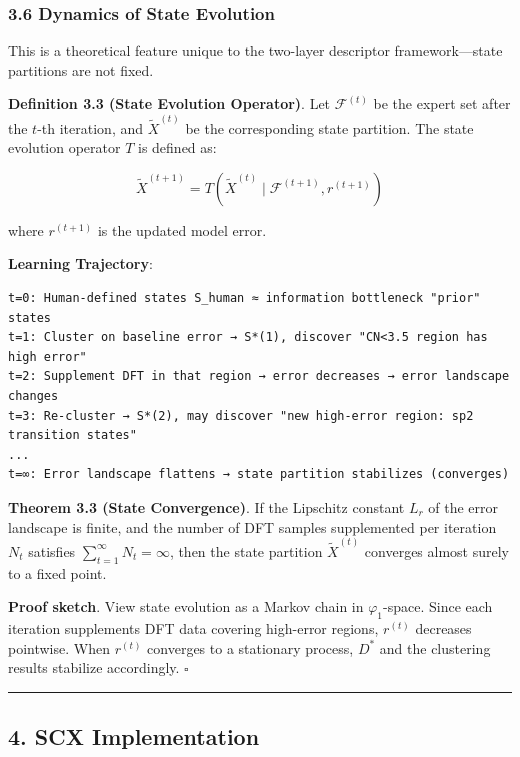\documentclass[
  12pt,
]{article}
\begin{document}
\subsubsection{3.6 Dynamics of State Evolution}\label{dynamics-of-state-evolution}

This is a theoretical feature unique to the two-layer descriptor framework---state partitions are not fixed.

\textbf{Definition 3.3 (State Evolution Operator)}. Let $\mathcal{F}^{(t)}$ be the expert set after the $t$-th iteration, and $\tilde{X}^{(t)}$ be the corresponding state partition. The state evolution operator $T$ is defined as:

\[\tilde{X}^{(t+1)} = T(\tilde{X}^{(t)} \mid \mathcal{F}^{(t+1)}, r^{(t+1)})\]

where $r^{(t+1)}$ is the updated model error.

\textbf{Learning Trajectory}:

\begin{verbatim}
t=0: Human-defined states S_human ≈ information bottleneck "prior" states
t=1: Cluster on baseline error → S*(1), discover "CN<3.5 region has high error"
t=2: Supplement DFT in that region → error decreases → error landscape changes
t=3: Re-cluster → S*(2), may discover "new high-error region: sp2 transition states"
...
t=∞: Error landscape flattens → state partition stabilizes (converges)
\end{verbatim}

\textbf{Theorem 3.3 (State Convergence)}. If the Lipschitz constant $L_r$ of the error landscape is finite, and the number of DFT samples supplemented per iteration $N_t$ satisfies $\sum_{t=1}^\infty N_t = \infty$, then the state partition $\tilde{X}^{(t)}$ converges almost surely to a fixed point.

\textbf{Proof sketch}. View state evolution as a Markov chain in $\varphi_1$-space. Since each iteration supplements DFT data covering high-error regions, $r^{(t)}$ decreases pointwise. When $r^{(t)}$ converges to a stationary process, $D^*$ and the clustering results stabilize accordingly. $\square$

\begin{center}\rule{0.5\linewidth}{0.5pt}\end{center}

\subsection{4. SCX Implementation}\label{scx-implementation}
\end{document}
